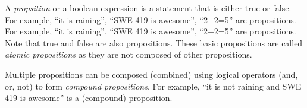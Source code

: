 \documentclass[oneside,11pt,dvipsnames]{book}
\renewcommand{\implies}{\Rightarrow}
\begin{document}
A \emph{propsition} or a boolean expression is a statement that is either true or false. For example, ``it is raining'', ``SWE 419 is awesome'', ``2+2=5'' are propositions. For example, ``it is raining'', ``SWE 419 is awesome'', ``2+2=5'' are propositions. Note that true and false are also propositions.  These basic propositions are called \emph{atomic propositions} as they are not composed of other propositions.

Multiple propositions can be composed (combined) using logical operators (and, or, not) to form \emph{compound propositions}. For example, ``it is not raining and SWE 419 is awesome'' is a (compound) proposition. 




            
\end{document}
